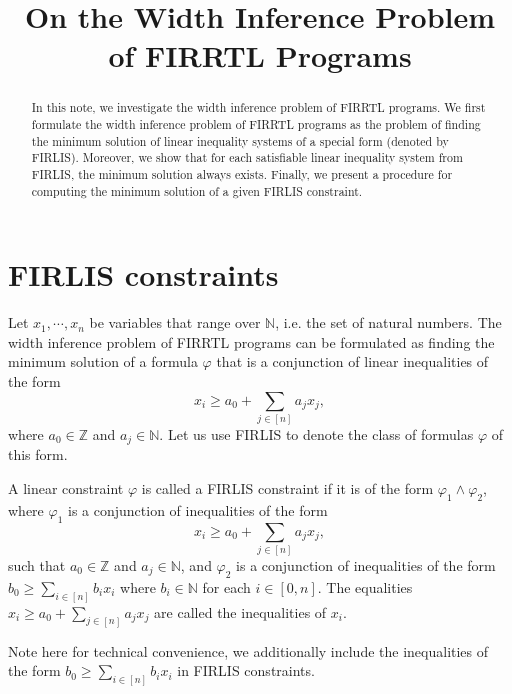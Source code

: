 \documentclass[runningheads]{llncs}
\title{On the Width Inference Problem of FIRRTL Programs}
\author{}
\institute{}
\newcommand\natnum{\mathbb{N}}
\newcommand\intnum{\mathbb{Z}}
\newcommand\firlis{FIRLIS}
\begin{document}
\maketitle

\begin{abstract}
In this note, we investigate the width inference problem of FIRRTL programs. We first formulate the width inference problem of FIRRTL programs as the problem of finding the minimum solution of linear inequality systems of a special form (denoted by FIRLIS). Moreover, we show that for each satisfiable linear inequality system from FIRLIS, the minimum solution always exists. Finally, we present a procedure for computing the minimum solution of a given FIRLIS constraint. 
\end{abstract}

\section{{\firlis} constraints}

Let $x_1, \cdots, x_n$ be variables that range over $\natnum$, i.e. the set of natural numbers. 
The width inference problem of FIRRTL programs can be formulated as finding the minimum solution of a formula $\varphi$ that is a conjunction of linear inequalities of the form
\[x_i \ge a_{0} + \sum \limits_{j \in [n]} a_{j} x_j, \]
where $a_{0} \in \intnum$ and $a_{j} \in \natnum$. 
Let us use {\firlis} to denote the class of formulas $\varphi$ of this form.  

\begin{definition}[{\firlis} constraints]
A linear constraint $\varphi$ is called a {\firlis} constraint if it is of the form $\varphi_1 \wedge \varphi_2$, where $\varphi_1$ is a conjunction of inequalities of the form
\[x_i \ge a_{0} + \sum \limits_{j \in [n]} a_{j} x_j, \]
such that $a_{0} \in \intnum$ and $a_{j} \in \natnum$, and $\varphi_2$ is a conjunction of inequalities of the form $b_0 \ge \sum \limits_{i \in [n]} b_i x_i$ where $b_i \in \natnum$ for each $i \in [0, n]$. The equalities $x_i \ge a_{0} + \sum \limits_{j \in [n]} a_{j} x_j$ are called the inequalities of $x_i$. 
\end{definition}

\begin{remark}
Note here for technical convenience, we additionally include the inequalities of the form $b_0 \ge \sum \limits_{i \in [n]} b_i x_i$ in {\firlis} constraints. 
\end{remark}
\end{document}
